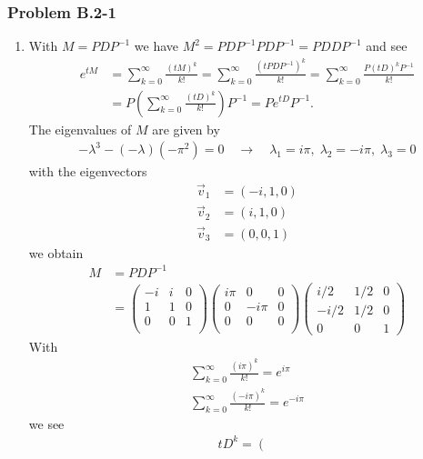 \documentclass[10pt,a4paper]{book}
\theoremstyle{definition}
\begin{document}
\subsubsection{Problem B.2-1}
\begin{enumerate}
\item
With $M=PDP^{-1}$ we have $M^2=PDP^{-1}PDP^{-1}=PDDP^{-1}$ and see
\begin{align}
    e^{tM}&=\sum_{k=0}^\infty \frac{(tM)^k}{k!}=\sum_{k=0}^\infty \frac{(tPDP^{-1})^k}{k!}=\sum_{k=0}^\infty \frac{P(tD)^kP^{-1}}{k!}\\
    &=P\left(\sum_{k=0}^\infty \frac{(tD)^k}{k!}\right)P^{-1}=Pe^{tD}P^{-1}.
\end{align}
The eigenvalues of $M$ are given by
\begin{align}
    -\lambda^3-(-\lambda)(-\pi^2)=0\quad\rightarrow\quad\lambda_1=i\pi,\;\lambda_2=-i\pi,\;\lambda_3= 0
\end{align}
with the eigenvectors
\begin{align}
    \vec{v}_1&=(-i,1,0)\\
    \vec{v}_2&=(i,1,0)\\
    \vec{v}_3&=(0,0,1)
\end{align}
we obtain
\begin{align}
M&=PDP^{-1}\\
&=\left(
\begin{array}{ccc}
-i& i & 0 \\
1 & 1 & 0 \\
0 & 0 & 1 \\
\end{array}
\right)
\left(
\begin{array}{ccc}
 i\pi & 0 & 0 \\
 0 & -i\pi & 0 \\
 0 & 0 & 0 \\
\end{array}
\right)
\left(
\begin{array}{ccc}
  i/2 & 1/2 & 0 \\
 -i/2 & 1/2 & 0 \\
 0    & 0   & 1
\end{array}
\right)
\end{align}
With
\begin{align}
\sum_{k=0}^\infty \frac{(i\pi)^k}{k!}=e^{i\pi}\\
\sum_{k=0}^\infty \frac{(-i\pi)^k}{k!}=e^{-i\pi}
\end{align}
we see
\begin{align}
 tD^k=\left(
\begin{array}{ccc}

\end{array}
\end{align}
\end{enumerate}
\end{document}
